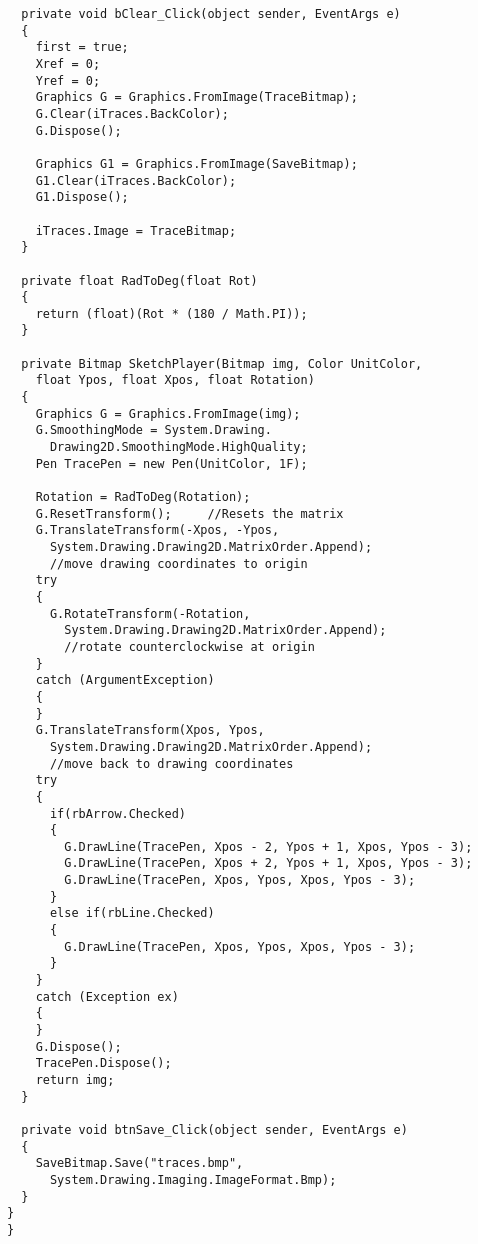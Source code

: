 \begin{lstlisting}
  private void bClear_Click(object sender, EventArgs e)
  {
    first = true;
    Xref = 0;
    Yref = 0;
    Graphics G = Graphics.FromImage(TraceBitmap);
    G.Clear(iTraces.BackColor);
    G.Dispose();

    Graphics G1 = Graphics.FromImage(SaveBitmap);
    G1.Clear(iTraces.BackColor);
    G1.Dispose();

    iTraces.Image = TraceBitmap;
  }

  private float RadToDeg(float Rot)
  {
    return (float)(Rot * (180 / Math.PI));
  }

  private Bitmap SketchPlayer(Bitmap img, Color UnitColor, 
    float Ypos, float Xpos, float Rotation)
  {
    Graphics G = Graphics.FromImage(img);
    G.SmoothingMode = System.Drawing.
      Drawing2D.SmoothingMode.HighQuality;
    Pen TracePen = new Pen(UnitColor, 1F);

    Rotation = RadToDeg(Rotation);
    G.ResetTransform();     //Resets the matrix
    G.TranslateTransform(-Xpos, -Ypos, 
      System.Drawing.Drawing2D.MatrixOrder.Append);        
      //move drawing coordinates to origin
    try
    {
      G.RotateTransform(-Rotation, 
        System.Drawing.Drawing2D.MatrixOrder.Append);          
        //rotate counterclockwise at origin
    }
    catch (ArgumentException)
    {
    }
    G.TranslateTransform(Xpos, Ypos, 
      System.Drawing.Drawing2D.MatrixOrder.Append);          
      //move back to drawing coordinates
    try
    {
      if(rbArrow.Checked)
      {
        G.DrawLine(TracePen, Xpos - 2, Ypos + 1, Xpos, Ypos - 3);
        G.DrawLine(TracePen, Xpos + 2, Ypos + 1, Xpos, Ypos - 3);
        G.DrawLine(TracePen, Xpos, Ypos, Xpos, Ypos - 3);
      }
      else if(rbLine.Checked)
      {
        G.DrawLine(TracePen, Xpos, Ypos, Xpos, Ypos - 3);
      }
    }
    catch (Exception ex)
    {
    }
    G.Dispose();
    TracePen.Dispose();
    return img;
  }

  private void btnSave_Click(object sender, EventArgs e)
  {
    SaveBitmap.Save("traces.bmp", 
      System.Drawing.Imaging.ImageFormat.Bmp);
  }
}
}


\end{lstlisting}